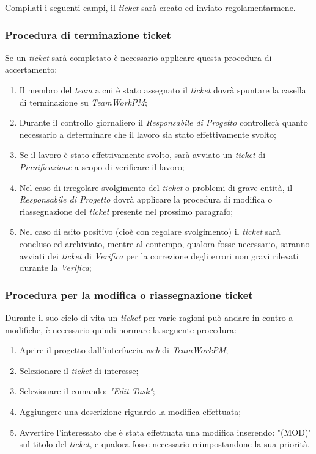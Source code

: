 Compilati i seguenti campi, il \textit{ticket} sarà creato ed inviato regolamentarmene.

\subsubsection{Procedura di terminazione ticket}
Se un \textit{ticket} sarà completato è necessario applicare questa procedura di accertamento:
\begin{enumerate}
\item Il membro del \textit{team} a cui è stato assegnato il \textit{ticket} dovrà spuntare la casella di terminazione su \textit{TeamWorkPM};
\item Durante il controllo giornaliero il \textit{Responsabile di Progetto} controllerà quanto necessario a determinare che il lavoro sia stato effettivamente svolto;
\item Se il lavoro è stato effettivamente svolto, sarà avviato un \textit{ticket} di \emph{Pianificazione} a scopo di verificare il lavoro;
\item Nel caso di irregolare svolgimento del \textit{ticket} o problemi di grave entità, il \textit{Responsabile di Progetto} dovrà applicare la procedura di modifica o riassegnazione del \textit{ticket} presente nel prossimo paragrafo;
\item Nel caso di esito positivo (cioè con regolare svolgimento) il \textit{ticket} sarà concluso ed archiviato, mentre al contempo, qualora fosse necessario, saranno avviati dei \textit{ticket} di \emph{Verifica} per la correzione degli errori non gravi rilevati durante la \textit{Verifica};

\end{enumerate}

\subsubsection{Procedura per la modifica o riassegnazione ticket} 
Durante il suo ciclo di vita un \textit{ticket} per varie ragioni può andare in contro a modifiche, è necessario quindi normare la seguente procedura:
\begin{enumerate}
\item Aprire il progetto dall'interfaccia \textit{web} di \textit{TeamWorkPM};
\item Selezionare il \textit{ticket} di interesse;
\item Selezionare il comando: \emph{"Edit Task"};
\item Aggiungere una descrizione riguardo la modifica effettuata;
\item Avvertire l'interessato che è stata effettuata una modifica inserendo: "(MOD)" sul titolo del \textit{ticket}, e qualora fosse necessario reimpostandone la sua priorità.
\end{enumerate}

